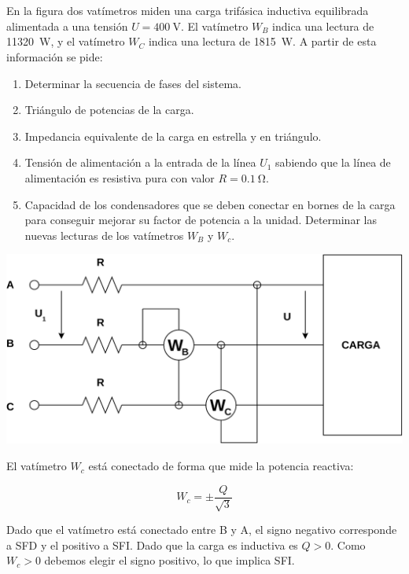 \documentclass[12pt]{article}
\begin{document}
\section{}

En la figura dos vatímetros miden una carga trifásica inductiva
equilibrada alimentada a una tensión $U = \SI{400}{\volt}$. El
vatímetro $W_B$ indica una lectura de \SI{11320}{\watt}, y el
vatímetro $W_C$ indica una lectura de \SI{1815}{\watt}. A partir de
esta información se pide:

\begin{enumerate}
\item Determinar la secuencia de fases del sistema.
\item Triángulo de potencias de la carga.
\item Impedancia equivalente de la carga en estrella y
  en triángulo.
\item Tensión de alimentación a la entrada de la línea
  $U_1$ sabiendo que la línea de alimentación es resistiva pura con
  valor $R = \SI{0.1}{\ohm}$.
\item Capacidad de los condensadores que se deben
  conectar en bornes de la carga para conseguir mejorar su factor de
  potencia a la unidad. Determinar las nuevas lecturas de los
  vatímetros $W_B$ y $W_c$.
\end{enumerate}

\begin{center}
  \includegraphics[height=0.3\textheight]{../figs/Esquema.pdf}
\end{center}

\noindent\hrulefill

El vatímetro $W_c$ está conectado de forma que mide la potencia
reactiva:

\[
  W_c = \pm \frac{Q}{\sqrt{3}}
\]

Dado que el vatímetro está conectado entre B y A, el signo negativo
corresponde a SFD y el positivo a SFI. Dado que la carga es inductiva
es $Q > 0$. Como $W_c > 0$ debemos elegir el signo positivo, lo que
implica SFI.
\end{document}
